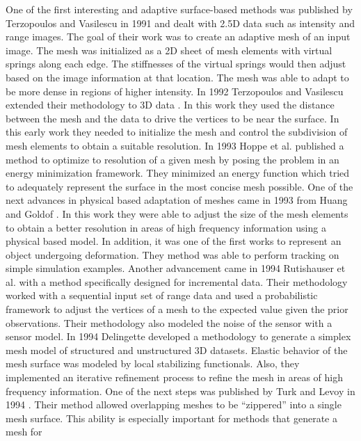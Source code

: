 \documentclass[12pt]{article}
\begin{document}
One of the first interesting and adaptive surface-based methods was
published by Terzopoulos and Vasilescu in 1991 \cite{Terzopoulos1991a} and
dealt with 2.5D data such as intensity and range images. The goal of their
work was to create an adaptive mesh of an input image. The mesh was
initialized as a 2D sheet of mesh elements with virtual springs along each
edge. The stiffnesses of the virtual springs would then adjust based on the
image information at that location. The mesh was able to adapt to be more
dense in regions of higher intensity. In 1992 Terzopoulos and Vasilescu
extended their methodology to 3D data \cite{Vasilescu1992}. In this work
they used the distance between the mesh and the data to drive the vertices
to be near the surface. In this early work they needed to initialize the
mesh and control the subdivision of mesh elements to obtain a suitable
resolution. In 1993 Hoppe et al. \cite{Hoppe:1993:MO:166117.166119}
published a method to optimize to resolution of a given mesh by posing the
problem in an energy minimization framework. They minimized an energy
function which tried to adequately represent the surface in the most
concise mesh possible. One of the next advances in physical based
adaptation of meshes came in 1993 from Huang and Goldof \cite{Huang1993}.
In this work they were able to adjust the size of the mesh elements to
obtain a better resolution in areas of high frequency information using a
physical based model. In addition, it was one of the first works to 
represent an object undergoing deformation. They method was able to perform
tracking on simple simulation examples. Another advancement came in 1994
Rutishauser et al. \cite{Rutishauser1994} with a method specifically
designed for incremental data. Their methodology worked with a sequential
input set of range data and used a probabilistic framework to adjust the
vertices of a mesh to the expected value given the prior observations.
Their methodology also modeled the noise of the sensor with a sensor model.
In 1994 Delingette \cite{Delingette1994} developed a methodology to
generate a simplex mesh model of structured and unstructured 3D datasets.
Elastic behavior of the mesh surface was modeled by local stabilizing
functionals. Also, they implemented an iterative refinement process to
refine the mesh in areas of high frequency information. One of the next
steps was published by Turk and Levoy in 1994 \cite{Turk1994}. Their method
allowed overlapping meshes to be ``zippered'' into a single mesh surface.
This ability is especially important for methods that generate a mesh for
\end{document}
